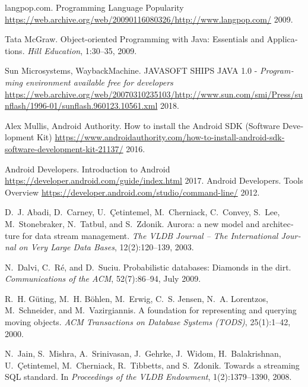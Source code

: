 \begin{thebibliography}{1}
\bibitem{[JAVA6]} {\textlatin{
{langpop.com}.
Programming Language Popularity
\url{https://web.archive.org/web/20090116080326/http://www.langpop.com/}
  2009}}.
  
\bibitem{[JAVA7]} {\textlatin{
{Tata McGraw}. 
Object-oriented Programming with Java: Essentials and Applications.
{\em Hill Education}, 1:30--35, 2009}}.  

\bibitem{[JAVA8]} {\textlatin{
{Sun Microsystems, WaybackMachine}.
JAVASOFT SHIPS JAVA 1.0 - {\em
Programming environment available free for developers}
\url{https://web.archive.org/web/20070310235103/http://www.sun.com/smi/Press/sunflash/1996-01/sunflash.960123.10561.xml}
  2018}}.  
  
\bibitem{[JAVA9]} {\textlatin{
{Alex Mullis, Android Authority}.
How to install the Android SDK (Software Development Kit)
\url{https://www.androidauthority.com/how-to-install-android-sdk-software-development-kit-21137/}
  2016}}. 
  
\bibitem{[JAVA10]} {\textlatin{
{Android Developers}.
Introduction to Android
\url{https://developer.android.com/guide/index.html}
  2017}}.  
\bibitem{[JAVA11]} {\textlatin{
{Android Developers}.
Tools Overview
\url{https://developer.android.com/studio/command-line/}
  2012}}.  





\bibitem{[ACC+03]} {\textlatin{
D.~J. Abadi, D.~Carney, U.~{\c{C}}etintemel, M.~Cherniack, C.~Convey, S.~Lee,  M.~Stonebraker, N.~Tatbul, and S.~Zdonik. 
Aurora: a new model and architecture for data stream management.
{\em The VLDB Journal -- The International Journal on Very Large Data Bases}, 12(2):120--139, 2003}}.

\bibitem{[DRS09]} {\textlatin{
N.~Dalvi, C.~R{\'e}, and D.~Suciu. Probabilistic databases: Diamonds in the dirt. {\em Communications of the ACM}, 52(7):86--94, July 2009}}.

\bibitem{[GBE+00]} {\textlatin{
R.~H. G{\"u}ting, M.~H. B{\"o}hlen, M.~Erwig, C.~S. Jensen, N.~A. Lorentzos,
  M.~Schneider, and M.~Vazirgiannis.
A foundation for representing and querying moving objects.
{\em ACM Transactions on Database Systems (TODS)}, 25(1):1--42, 2000}}.

\bibitem{[JMS+08]} {\textlatin{
N.~Jain, S.~Mishra, A.~Srinivasan, J.~Gehrke, J.~Widom, H.~Balakrishnan,
  U.~{\c{C}}etintemel, M.~Cherniack, R.~Tibbetts, and S.~Zdonik.
Towards a streaming {SQL} standard.
In {\em Proceedings of the VLDB Endowment}, 1(2):1379--1390, 2008}}.


\end{thebibliography}
